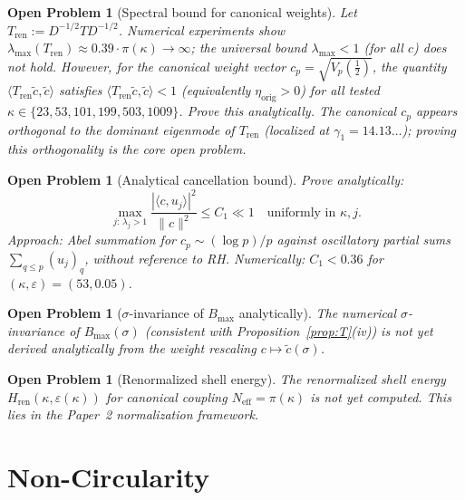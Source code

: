 \documentclass[11pt]{article}
\newtheorem{openproblem}[theorem]{Open Problem}
\newcommand{\etaorig}{\eta_{\mathrm{orig}}}
\newcommand{\Tren}{T_{\mathrm{ren}}}
\newcommand{\Hren}{H_{\mathrm{ren}}}
\begin{document}
\begin{openproblem}[Spectral bound for canonical weights]\label{op:spectral}
Let $\Tren:=D^{-1/2}TD^{-1/2}$.
Numerical experiments show $\lambda_{\max}(\Tren)\approx 0.39\cdot\pi(\kappa)\to\infty$;
the universal bound $\lambda_{\max}<1$ (for all $c$) does not hold.
However, for the canonical weight vector $c_p=\sqrt{V_p({\textstyle\frac12})}$,
the quantity $\langle\Tren\tilde{c},\tilde{c}\rangle$ satisfies
$\langle\Tren\tilde{c},\tilde{c}\rangle<1$ (equivalently $\etaorig>0$)
for all tested $\kappa\in\{23,53,101,199,503,1009\}$.
Prove this analytically. The canonical $c_p$ appears orthogonal to the
dominant eigenmode of $\Tren$ (localized at $\gamma_1=14.13\ldots$);
proving this orthogonality is the core open problem.
\end{openproblem}

\begin{openproblem}[Analytical cancellation bound]\label{op:cancel}
Prove analytically:
\[
\max_{j:\,\lambda_j>1}\frac{|\langle c,u_j\rangle|^2}{\|c\|^2}\leq C_1\ll 1
\quad\text{uniformly in }\kappa,j.
\]
Approach: Abel summation for $c_p\sim(\log p)/p$ against oscillatory partial
sums $\sum_{q\leq p}(u_j)_q$, without reference to RH.
Numerically: $C_1<0.36$ for $(\kappa,\varepsilon)=(53,0.05)$.
\end{openproblem}

\begin{openproblem}[$\sigma$-invariance of $B_{\max}$ analytically]\label{op:sigma}
The numerical $\sigma$-invariance of $B_{\max}(\sigma)$ (consistent with
Proposition~\ref{prop:T}(iv)) is not yet derived analytically from the weight
rescaling $c\mapsto\tilde{c}(\sigma)$.
\end{openproblem}


\begin{openproblem}[Renormalized shell energy]\label{op:shell}
The renormalized shell energy $\Hren(\kappa,\varepsilon(\kappa))$ for canonical
coupling $N_{\mathrm{eff}}=\pi(\kappa)$ is not yet computed. This lies in the
Paper~2 normalization framework.
\end{openproblem}

\section{Non-Circularity}
\label{sec:nocirc}
\end{document}
